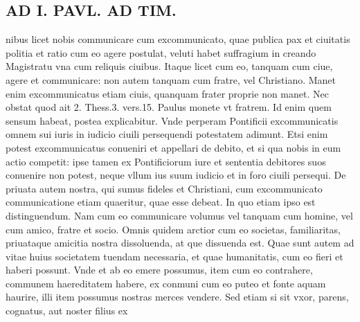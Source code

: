 \documentclass{article}
\begin{document}
\begin{pages}
\section*{AD I. PAVL. AD TIM. }
\marginpar{[ p.404 ]}\pstart nibus licet nobis communicare cum excommunicato, quae publica pax et ciuitatis politia et ratio cum eo agere postulat, veluti habet suffragium in creando Magistratu vna cum reliquis ciuibus. Itaque licet cum eo, tanquam cum ciue, agere et communicare: non autem tanquam cum fratre, vel Christiano. Manet enim excommunicatus etiam ciuis, quanquam frater proprie non manet. Nec obstat quod ait 2. Thess.3. vers.15. Paulus monete vt fratrem. Id enim quem sensum habeat, postea explicabitur. Vnde perperam Pontificii excommunicatis omnem sui iuris in iudicio ciuili persequendi potestatem adimunt. Etsi enim potest excommunicatus conueniri et appellari de debito, et si qua nobis in eum actio competit: ipse tamen ex Pontificiorum iure et sententia debitores suos conuenire non potest, neque vllum ius suum iudicio et in foro ciuili persequi. De priuata autem nostra, qui sumus fideles et Christiani, cum excommunicato communicatione etiam quaeritur, quae esse debeat. In quo etiam ipso est distinguendum. Nam cum eo communicare volumus vel tanquam cum homine, vel cum amico, fratre et socio. Omnis quidem arctior cum eo societas, familiaritas, priuataque amicitia nostra dissoluenda, at que dissuenda est. Quae sunt autem ad vitae huius societatem tuendam necessaria, et quae humanitatis, cum eo fieri et haberi possunt. Vnde et ab eo emere possumus, item cum eo contrahere, communem haereditatem habere, ex conmuni cum eo puteo et fonte aquam haurire, illi item possumus nostras merces vendere. Sed etiam si sit vxor, parens, cognatus, aut noster filius ex\pend

\end{pages}
\end{document}
